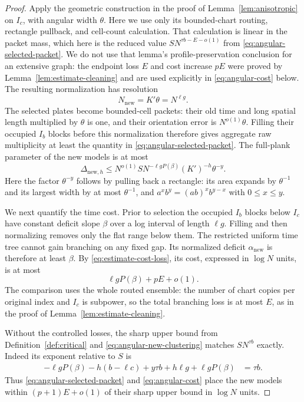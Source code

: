 \begin{proof}
Apply the geometric construction in the proof of
Lemma~\ref{lem:anisotropic} on $I_c$, with angular width $\theta$.
Here we use only its bounded-chart routing, rectangle pullback, and
cell-count calculation. That calculation is linear in the packet
mass, which here is the reduced value $SN^{\tau b-E-o(1)}$ from
\eqref{eq:angular-selected-packet}. We do not use that lemma's
profile-preservation conclusion for an extensive graph: the endpoint
loss $E$ and cost increase $pE$ were proved by
Lemma~\ref{lem:estimate-cleaning} and are used explicitly in
\eqref{eq:angular-cost} below. The resulting normalization has resolution
\begin{equation}
 N_{\mathrm{new}}=K'\theta=N^{\ell g}.
\label{eq:angular-new-resolution}
\end{equation}
The selected plates become bounded-cell packets: their old time and
long spatial length multiplied by $\theta$ is one, and their
orientation error is $N^{o(1)}\theta$. Filling their occupied $I_b$
blocks before this normalization therefore gives aggregate raw
multiplicity at least the quantity in
\eqref{eq:angular-selected-packet}. The full-plank parameter of the
new models is at most
\begin{equation}
 \Delta_{\mathrm{new},h}
 \le N^{o(1)}S N^{-\ell gP(\beta)}(K')^{-h}\theta^{-y}.
\label{eq:angular-new-clustering}
\end{equation}
Here the factor $\theta^{-y}$ follows by pulling back a rectangle:
its area expands by $\theta^{-1}$ and its largest width by at most
$\theta^{-1}$, and $a^xb^y=(ab)^xb^{y-x}$ with $0\le x\le y$.

We next quantify the time cost. Prior to selection the occupied
$I_b$ blocks below $I_c$ have constant deficit slope $\beta$ over a
log interval of length $\ell g$. Filling and then normalizing removes
only the flat range below them. The restricted uniform time tree
cannot gain branching on any fixed gap. Its normalized deficit
$\alpha_{\mathrm{new}}$ is therefore at least $\beta$. By
\eqref{eq:estimate-cost-loss}, its cost, expressed in $\log N$ units,
is at most
\begin{equation}
 \ell gP(\beta)+pE+o(1).
\label{eq:angular-cost}
\end{equation}
The comparison uses the whole routed ensemble: the number of chart
copies per original index and $I_c$ is subpower, so the total
branching loss is at most $E$, as in the proof of
Lemma~\ref{lem:estimate-cleaning}.

Without the controlled losses, the sharp upper bound from
Definition~\ref{def:critical} and
\eqref{eq:angular-new-clustering} matches $SN^{\tau b}$ exactly.
Indeed its exponent relative to $S$ is
\begin{align*}
 -\ell gP(\beta)-h(b-\ell c)+y\tau b
       +h\ell g+\ell gP(\beta)
 &=\tau b.
\end{align*}
Thus \eqref{eq:angular-selected-packet} and
\eqref{eq:angular-cost} place the new models within
$(p+1)E+o(1)$ of their sharp upper bound in $\log N$ units.


\end{proof}
